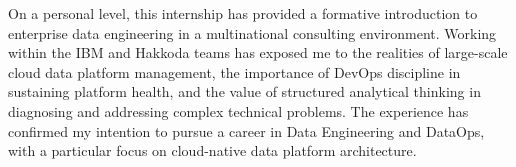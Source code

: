 \vspace{0.4cm}

On a personal level, this internship has provided a formative introduction to enterprise data engineering in a multinational consulting environment. Working within the IBM and Hakkoda teams has exposed me to the realities of large-scale cloud data platform management, the importance of DevOps discipline in sustaining platform health, and the value of structured analytical thinking in diagnosing and addressing complex technical problems. The experience has confirmed my intention to pursue a career in Data Engineering and DataOps, with a particular focus on cloud-native data platform architecture.

\newpage
